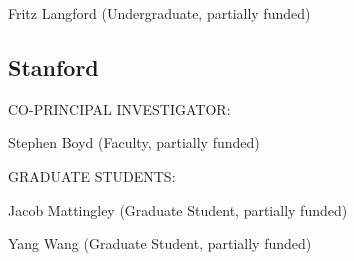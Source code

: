                \begin{indentation}{0pt}{0pt}{36pt}
                 Fritz Langford (Undergraduate, partially funded)
               \end{indentation}

               \begin{indentation}{0pt}{0pt}{0pt}
               \end{indentation}

               \subsection{Stanford}

               \begin{indentation}{0pt}{0pt}{0pt}
                 \uppercase{CO-PRINCIPAL INVESTIGATOR:}
               \end{indentation}

               \begin{indentation}{36pt}{0pt}{0pt}
                 Stephen Boyd (Faculty, partially funded)
               \end{indentation}

               \begin{indentation}{0pt}{0pt}{0pt}
               \end{indentation}

               \begin{indentation}{0pt}{0pt}{0pt}
                 \uppercase{GRADUATE STUDENTS:}
               \end{indentation}

               \begin{indentation}{0pt}{0pt}{0pt}

               \end{indentation}

               \begin{indentation}{36pt}{0pt}{0pt}
                 Jacob Mattingley (Graduate Student, partially funded)
               \end{indentation}

               \begin{indentation}{36pt}{0pt}{0pt}
                 Yang Wang (Graduate Student, partially funded)
               \end{indentation}

               \begin{indentation}{0pt}{0pt}{0pt}
               \end{indentation}

               \begin{indentation}{0pt}{0pt}{0pt}
               \end{indentation}

